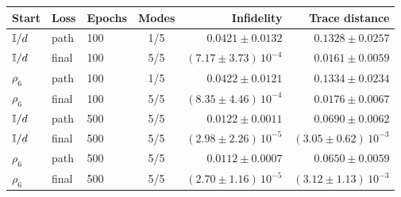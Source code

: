 \begin{tabular}{lllcrr}
\toprule
Start & Loss & Epochs & Modes & Infidelity & Trace distance \\
\midrule
$\mathbb{I}/d$ & path & 100 & 1/5 & $0.0421\pm0.0132$ & $0.1328\pm0.0257$ \\
$\mathbb{I}/d$ & final & 100 & 5/5 & $(7.17\pm3.73)\,10^{-4}$ & $0.0161\pm0.0059$ \\
$\rho_6$ & path & 100 & 1/5 & $0.0422\pm0.0121$ & $0.1334\pm0.0234$ \\
$\rho_6$ & final & 100 & 5/5 & $(8.35\pm4.46)\,10^{-4}$ & $0.0176\pm0.0067$ \\
$\mathbb{I}/d$ & path & 500 & 5/5 & $0.0122\pm0.0011$ & $0.0690\pm0.0062$ \\
$\mathbb{I}/d$ & final & 500 & 5/5 & $(2.98\pm2.26)\,10^{-5}$ & $(3.05\pm0.62)\,10^{-3}$ \\
$\rho_6$ & path & 500 & 5/5 & $0.0112\pm0.0007$ & $0.0650\pm0.0059$ \\
$\rho_6$ & final & 500 & 5/5 & $(2.70\pm1.16)\,10^{-5}$ & $(3.12\pm1.13)\,10^{-3}$ \\
\bottomrule
\end{tabular}
